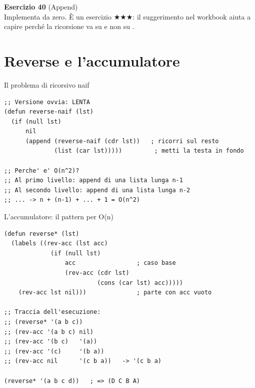 \begin{workbook}
\textbf{Esercizio 40} (Append)\\[4pt]
Implementa  da zero. È un esercizio $\bigstar\bigstar\bigstar$: il suggerimento
nel workbook aiuta a capire perché la ricorsione va su  e non
su .
\end{workbook}

\section{Reverse e l'accumulatore}

\begin{concetto}{Il problema di  ricorsivo naif}
\end{concetto}

\begin{esempio}
\begin{lstlisting}
;; Versione ovvia: LENTA
(defun reverse-naif (lst)
  (if (null lst)
      nil
      (append (reverse-naif (cdr lst))   ; ricorri sul resto
              (list (car lst)))))         ; metti la testa in fondo

;; Perche' e' O(n^2)?
;; Al primo livello: append di una lista lunga n-1
;; Al secondo livello: append di una lista lunga n-2
;; ... -> n + (n-1) + ... + 1 = O(n^2)
\end{lstlisting}
\end{esempio}

\begin{concetto}{L'accumulatore: il pattern per O(n)}

\boxsep
{}
\end{concetto}

\begin{esempio}
\begin{lstlisting}
(defun reverse* (lst)
  (labels ((rev-acc (lst acc)
             (if (null lst)
                 acc                 ; caso base
                 (rev-acc (cdr lst)
                          (cons (car lst) acc)))))
    (rev-acc lst nil)))              ; parte con acc vuoto

;; Traccia dell'esecuzione:
;; (reverse* '(a b c))
;; (rev-acc '(a b c) nil)
;; (rev-acc '(b c)   '(a))
;; (rev-acc '(c)     '(b a))
;; (rev-acc nil      '(c b a))   -> '(c b a)

(reverse* '(a b c d))   ; => (D C B A)
\end{lstlisting}
\end{esempio}

